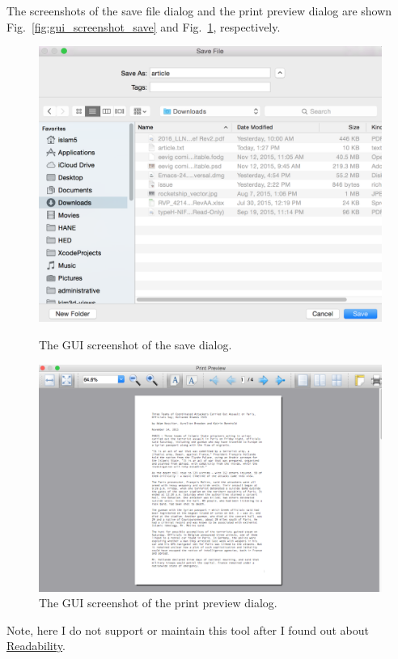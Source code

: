 \documentclass[]{article}
\begin{document}
The screenshots of the save file dialog and the print preview dialog
are shown Fig.~\ref{fig:gui_screenshot_save} and
Fig.~\ref{fig:gui_screenshot_printpreview}, respectively.
\begin{figure}[!ht]
  \parbox[!ht]{0.4\linewidth}{%
    \includegraphics[width=\linewidth]{images/gui_screenshot_save.png}
    \caption{The GUI screenshot of the save
      dialog.} \label{fig:gui_screenshot_save}} \hfill
  \parbox[!ht]{0.5\linewidth}{%
    \includegraphics[width=\linewidth]{images/gui_screenshot_printpreview.png}
    \caption{The GUI screenshot of the print preview
      dialog.} \label{fig:gui_screenshot_printpreview}}
\end{figure}
Note, here I do not support or maintain this tool after I found out
about \href{https://www.readability.com}{Readability}.
\end{document}
